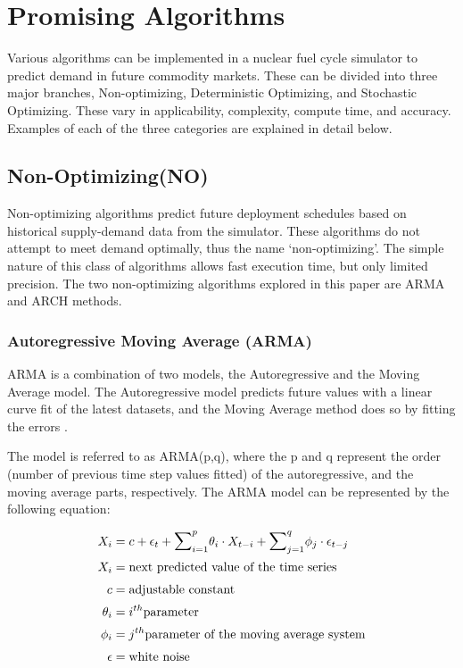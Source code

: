 \section{Promising Algorithms}
Various algorithms can be implemented in a nuclear fuel cycle simulator to 
predict demand in future commodity markets. These can be divided into three 
major branches, Non-optimizing, Deterministic Optimizing, and Stochastic 
Optimizing. These vary in applicability, complexity, compute time, and 
accuracy. Examples of each of the three categories are explained in detail below. 

\subsection{Non-Optimizing(NO)}

Non-optimizing algorithms predict future deployment schedules
based on historical supply-demand data from the simulator. These algorithms do not attempt
to meet demand optimally, thus the name `non-optimizing'. The simple nature of this class of algorithms
allows fast execution time, but only limited precision. The
two non-optimizing algorithms explored in this paper are \gls{ARMA}
and \gls{ARCH} methods. 

\subsubsection{Autoregressive Moving Average (ARMA)}

\gls{ARMA} is a combination of two models, the Autoregressive
and the Moving Average model. The Autoregressive model 
predicts future values with a linear curve fit of the latest
datasets, and the Moving Average method does so by fitting the 
errors \cite{stine_introduction_2011}.

The model is referred to as ARMA(p,q), where the p and q represent 
the order (number of previous time step values fitted) of the autoregressive,
and the moving average parts,
respectively. 
The \gls{ARMA} model can be represented by the following equation:

\begin{align} 
	X_i&=c + \epsilon_t + {\mathlarger{\sum}}_{i=1}^{p}\theta_i \cdot X_{t-i}+
	 {\mathlarger{\sum}}_{j=1}^{q}\phi_j\cdot\epsilon_{t-j}\\
	X_i&= \mbox{next predicted value of the time series}\\
	c&= \mbox{adjustable constant}\\
	\theta_i&=i^{th} \mbox{parameter}\\
	\phi_i&=j^{th} \mbox{parameter of the moving average system}\\
	\epsilon &= \mbox{white noise}
\end{align}


